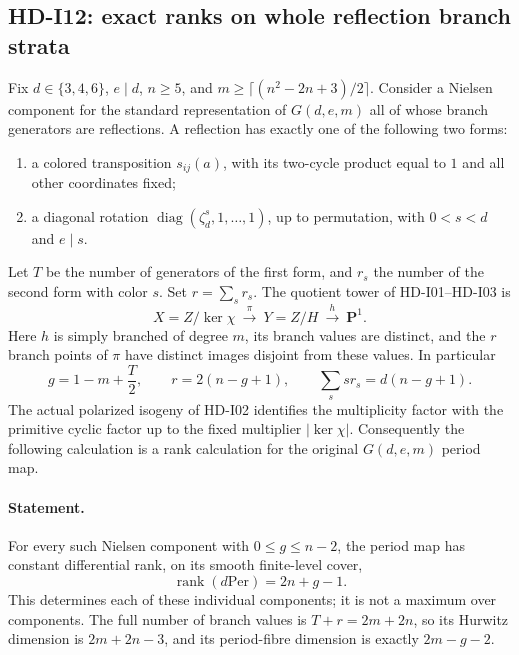 \subsection{HD-I12: exact ranks on whole reflection branch strata}
\label{sec:HD-I12}

Fix $d\in\{3,4,6\}$, $e\mid d$, $n\geq5$, and
$m\geq\lceil(n^2-2n+3)/2\rceil$.
Consider a Nielsen component for the standard representation of
$G(d,e,m)$ all of whose branch generators are reflections.  A reflection
has exactly one of the following two forms:
\begin{enumerate}
\item a colored transposition $s_{ij}(a)$, with its two-cycle product equal
to $1$ and all other coordinates fixed;
\item a diagonal rotation $\operatorname{diag}(\zeta_d^s,1,\ldots,1)$,
up to permutation, with $0<s<d$ and $e\mid s$.
\end{enumerate}
Let $T$ be the number of generators of the first form, and $r_s$ the
number of the second form with color $s$.  Set $r=\sum_s r_s$.
The quotient tower of HD-I01--HD-I03 is
\[
 X=Z/\ker\chi\ \xrightarrow{\;\pi\;}\ Y=Z/H
 \ \xrightarrow{\;h\;}\ \mathbf P^1.
\]
Here $h$ is simply branched of degree $m$, its branch values are distinct,
and the $r$ branch points of $\pi$ have distinct images disjoint from
these values.  In particular
\begin{equation}
 g=1-m+\frac T2,\qquad
 r=2(n-g+1),\qquad \sum_s s r_s=d(n-g+1).
 \tag{I12.1}
\end{equation}
The actual polarized isogeny of HD-I02 identifies the multiplicity factor
with the primitive cyclic factor up to the fixed multiplier $|\ker\chi|$.
Consequently the following calculation is a rank calculation for the
original $G(d,e,m)$ period map.

\paragraph{Statement.}
For every such Nielsen component with $0\leq g\leq n-2$, the period map
has constant differential rank, on its smooth finite-level cover,
\begin{equation}
 \operatorname{rank}(d\mathrm{Per})=2n+g-1.
 \tag{I12.2}
\end{equation}
This determines each of these individual components; it is not a maximum
over components.  The full number of branch values is
$T+r=2m+2n$, so its Hurwitz dimension is $2m+2n-3$, and its period-fibre
dimension is exactly $2m-g-2$.

